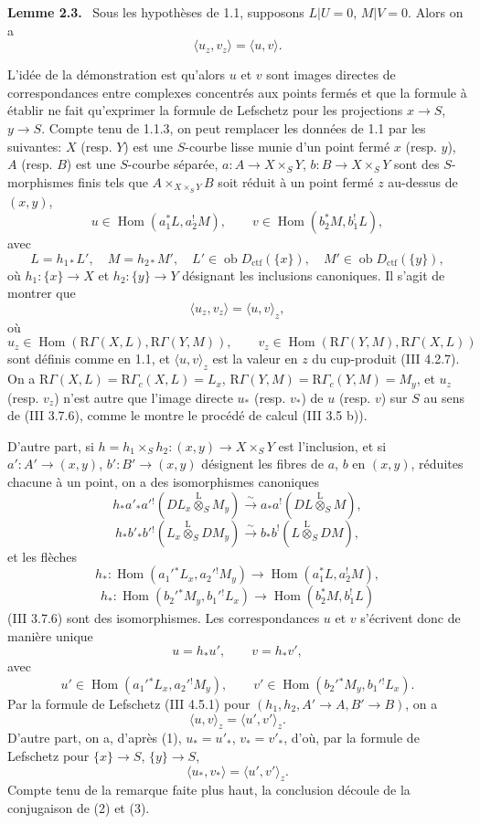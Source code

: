 \documentclass[11pt]{article}
\newenvironment{statement}[1]{\par\medskip\noindent\textbf{#1.}\ }{\par\medskip}
\DeclareMathOperator{\Hom}{Hom}
\newcommand{\R}{\mathrm{R}}\newcommand{\RHomCore}{\mathrm{RHom}}
\providecommand{\lten}{\overset{\mathrm L}{\otimes}}
\providecommand{\Ob}{\operatorname{ob}}
\providecommand{\Hom}{\operatorname{Hom}}
\providecommand{\lten}{\overset{\mathrm L}{\otimes}}
\providecommand{\lten}{\overset{\mathrm L}{\otimes}}
\providecommand{\Ob}{\operatorname{ob}}
\providecommand{\R}{\mathrm R}
\providecommand{\lten}{\overset{\mathrm L}{\otimes}}
\providecommand{\lten}{\overset{\mathrm L}{\otimes}}
\providecommand{\Ob}{\operatorname{Ob}}
\providecommand{\lten}{\overset{\mathrm L}{\otimes}}
\providecommand{\Hom}{\operatorname{Hom}}
\providecommand{\Ob}{\operatorname{ob}}
\providecommand{\Ob}{\operatorname{Ob}}
\providecommand{\lten}{\overset{\mathrm L}{\otimes}}
\begin{document}
\begin{statement}{Lemme 2.3}
Sous les hypothèses de 1.1, supposons $L|U=0$, $M|V=0$. Alors on a
\[
\langle u_z,v_z\rangle=\langle u,v\rangle .
\]
\end{statement}

L'idée de la démonstration est qu'alors $u$ et $v$ sont images directes de correspondances entre complexes concentrés aux points fermés et que la formule à établir ne fait qu'exprimer la formule de Lefschetz pour les projections $x\to S$, $y\to S$. Compte tenu de 1.1.3, on peut remplacer les données de 1.1 par les suivantes: $X$ (resp. $Y$) est une $S$-courbe lisse munie d'un point fermé $x$ (resp. $y$), $A$ (resp. $B$) est une $S$-courbe séparée, $a:A\to X\times_S Y$, $b:B\to X\times_S Y$ sont des $S$-morphismes finis tels que $A\times_{X\times_SY}B$ soit réduit à un point fermé $z$ au-dessus de $(x,y)$,
\[
u\in\Hom(a_1^*L,a_2^!M),\qquad v\in\Hom(b_2^*M,b_1^!L),
\]
avec
\[
L=h_{1*}L',\quad M=h_{2*}M',\quad
L'\in\Ob D_{\mathrm{ctf}}(\{x\}),\quad M'\in\Ob D_{\mathrm{ctf}}(\{y\}),
\]
où $h_1:\{x\}\to X$ et $h_2:\{y\}\to Y$ désignant les inclusions canoniques. Il s'agit de montrer que
\[
\langle u_z,v_z\rangle=\langle u,v\rangle_z,
\]
où
\[
u_z\in\Hom(\R\Gamma(X,L),\R\Gamma(Y,M)),\qquad
v_z\in\Hom(\R\Gamma(Y,M),\R\Gamma(X,L))
\]
sont définis comme en 1.1, et $\langle u,v\rangle_z$ est la valeur en $z$ du cup-produit (III 4.2.7). On a $\R\Gamma(X,L)=\R\Gamma_c(X,L)=L_x$, $\R\Gamma(Y,M)=\R\Gamma_c(Y,M)=M_y$, et $u_z$ (resp. $v_z$) n'est autre que l'image directe $u_*$ (resp. $v_*$) de $u$ (resp. $v$) sur $S$ au sens de (III 3.7.6), comme le montre le procédé de calcul (III 3.5 b)).

D'autre part, si $h=h_1\times_Sh_2:(x,y)\to X\times_SY$ est l'inclusion, et si $a':A'\to(x,y)$, $b':B'\to(x,y)$ désignent les fibres de $a$, $b$ en $(x,y)$, réduites chacune à un point, on a des isomorphismes canoniques
\[
h_*a'_*a'{}^!(DL_x\lten_SM_y)
 \xrightarrow{\sim} a_*a^!(DL\lten_SM),
\]
\[
h_*b'_*b'{}^!(L_x\lten_SDM_y)
 \xrightarrow{\sim} b_*b^!(L\lten_SDM),
\]
et les flèches
\[
h_*:\Hom(a_1'{}^*L_x,a_2'{}^!M_y)\to \Hom(a_1^*L,a_2^!M),
\]
\[
h_*:\Hom(b_2'{}^*M_y,b_1'{}^!L_x)\to \Hom(b_2^*M,b_1^!L)
\]
(III 3.7.6) sont des isomorphismes. Les correspondances $u$ et $v$ s'écrivent donc de manière unique
\begin{equation}\tag{1}
u=h_*u',\qquad v=h_*v',
\end{equation}
avec
\[
u'\in\Hom(a_1'{}^*L_x,a_2'{}^!M_y),\qquad
v'\in\Hom(b_2'{}^*M_y,b_1'{}^!L_x).
\]
Par la formule de Lefschetz (III 4.5.1) pour $(h_1,h_2,A'\to A,B'\to B)$, on a
\begin{equation}\tag{2}
\langle u,v\rangle_z=\langle u',v'\rangle_z .
\end{equation}
D'autre part, on a, d'après (1), $u_*=u'_*$, $v_*=v'_*$, d'où, par la formule de Lefschetz pour $\{x\}\to S$, $\{y\}\to S$,
\begin{equation}\tag{3}
\langle u_*,v_*\rangle=\langle u',v'\rangle_z .
\end{equation}
Compte tenu de la remarque faite plus haut, la conclusion découle de la conjugaison de (2) et (3).
\end{document}

